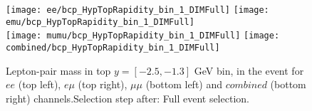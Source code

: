 







% 
% 

\begin{figure}
  \texttt{[image: ee/bcp\_HypTopRapidity\_bin\_1\_DIMFull]}
  \texttt{[image: emu/bcp\_HypTopRapidity\_bin\_1\_DIMFull]}\\
  \texttt{[image: mumu/bcp\_HypTopRapidity\_bin\_1\_DIMFull]}
  \texttt{[image: combined/bcp\_HypTopRapidity\_bin\_1\_DIMFull]}
\caption{Lepton-pair mass in top $y = [-2.5,-1.3]$ GeV bin, in the event for $ee$ (top left), $e\mu$ (top right), $\mu\mu$ (bottom left) and $combined$ (bottom right) channels.\newline Selection step after: Full event selection.}
\end{figure}

